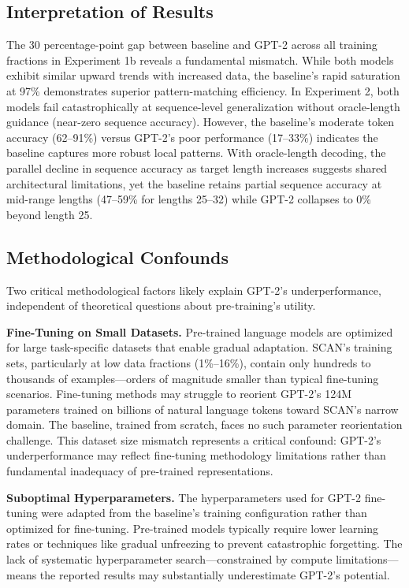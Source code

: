 \documentclass[11pt]{article}
\begin{document}
\subsection{Interpretation of Results}

The 30 percentage-point gap between baseline and GPT-2 across all training fractions in Experiment 1b reveals a fundamental mismatch. While both models exhibit similar upward trends with increased data, the baseline's rapid saturation at 97\% demonstrates superior pattern-matching efficiency. In Experiment 2, both models fail catastrophically at sequence-level generalization without oracle-length guidance (near-zero sequence accuracy). However, the baseline's moderate token accuracy (62--91\%) versus GPT-2's poor performance (17--33\%) indicates the baseline captures more robust local patterns. With oracle-length decoding, the parallel decline in sequence accuracy as target length increases suggests shared architectural limitations, yet the baseline retains partial sequence accuracy at mid-range lengths (47--59\% for lengths 25--32) while GPT-2 collapses to 0\% beyond length 25.

\subsection{Methodological Confounds}

Two critical methodological factors likely explain GPT-2's underperformance, independent of theoretical questions about pre-training's utility.

\textbf{Fine-Tuning on Small Datasets.} Pre-trained language models are optimized for large task-specific datasets that enable gradual adaptation. SCAN's training sets, particularly at low data fractions (1\%--16\%), contain only hundreds to thousands of examples---orders of magnitude smaller than typical fine-tuning scenarios. Fine-tuning methods may struggle to reorient GPT-2's 124M parameters trained on billions of natural language tokens toward SCAN's narrow domain. The baseline, trained from scratch, faces no such parameter reorientation challenge. This dataset size mismatch represents a critical confound: GPT-2's underperformance may reflect fine-tuning methodology limitations rather than fundamental inadequacy of pre-trained representations.

\textbf{Suboptimal Hyperparameters.} The hyperparameters used for GPT-2 fine-tuning were adapted from the baseline's training configuration rather than optimized for fine-tuning. Pre-trained models typically require lower learning rates or techniques like gradual unfreezing to prevent catastrophic forgetting. The lack of systematic hyperparameter search---constrained by compute limitations---means the reported results may substantially underestimate GPT-2's potential.
\end{document}
